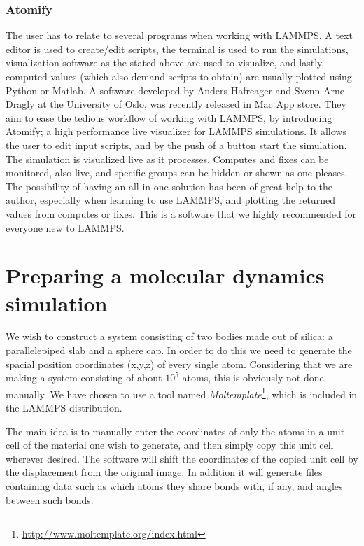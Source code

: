 \documentclass[twoside,english]{uiofysmaster}
\begin{document}
\subsection{Atomify}
The user has to relate to several programs when working with LAMMPS. 
A text editor is used to create/edit scripts, the terminal is used to run the simulations, visualization software as the stated above are used to visualize, and lastly, computed values (which also demand scripts to obtain) are usually plotted using Python or Matlab. 
A software developed by Anders Hafreager and Svenn-Arne Dragly at the University of Oslo,  
was recently released in Mac App store.  
They aim to ease the tedious workflow of working with LAMMPS, by introducing Atomify; a high performance live visualizer for LAMMPS simulations.
It allows the user to edit input scripts, and by the push of a button start the simulation.
The simulation is visualized live as it processes.
Computes and fixes can be monitored, also live, and specific groups can be hidden or shown as one pleases. 
The possibility of having an all-in-one solution has been of great help to the author, especially when learning to use LAMMPS, and plotting the returned values from computes or fixes. 
This is a software that we highly recommended for everyone new to LAMMPS.   





\chapter{Preparing a molecular dynamics simulation}

We wish to construct a system consisting of two bodies made out of silica: a parallelepiped slab and a sphere cap. In order to do this we need to generate the spacial position coordinates (x,y,z) of every single atom. Considering that we are making a system consisting of about $10^5$ atoms, this is obviously not done manually. We have chosen to use a tool named \textit{Moltemplate}\footnote{\href{http://www.moltemplate.org/index.html}{http://www.moltemplate.org/index.html}}, which is included in the LAMMPS distribution.

The main idea is to manually enter the coordinates of only the atoms in a unit cell of the material one wish to generate, and then simply copy this unit cell wherever desired. The software will shift the coordinates of the copied unit cell by the displacement from the original image. In addition it will generate files containing data such as which atoms they share bonds with, if any, and angles between such bonds. 
\end{document}
